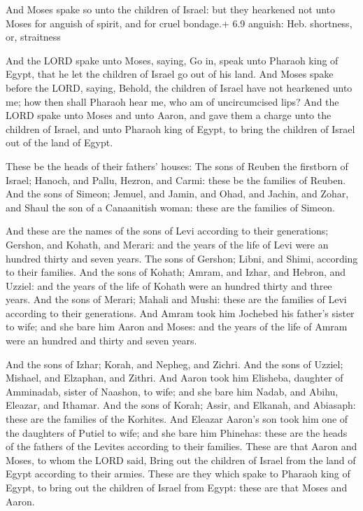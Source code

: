  And Moses spake so unto the children of Israel: but they
hearkened not unto Moses for anguish of spirit, and for cruel bondage.+
6.9 anguish: Heb. shortness, or, straitness

 And the LORD spake unto Moses, saying,  Go
in, speak unto Pharaoh king of Egypt, that he let the children of Israel
go out of his land.  And Moses spake before the LORD,
saying, Behold, the children of Israel have not hearkened unto me; how
then shall Pharaoh hear me, who am of uncircumcised lips? 
And the LORD spake unto Moses and unto Aaron, and gave them a charge
unto the children of Israel, and unto Pharaoh king of Egypt, to bring
the children of Israel out of the land of Egypt.

 These be the heads of their fathers' houses: The sons of
Reuben the firstborn of Israel; Hanoch, and Pallu, Hezron, and Carmi:
these be the families of Reuben.  And the sons of Simeon;
Jemuel, and Jamin, and Ohad, and Jachin, and Zohar, and Shaul the son of
a Canaanitish woman: these are the families of Simeon.

 And these are the names of the sons of Levi according to
their generations; Gershon, and Kohath, and Merari: and the years of the
life of Levi were an hundred thirty and seven years.  The
sons of Gershon; Libni, and Shimi, according to their families.
 And the sons of Kohath; Amram, and Izhar, and Hebron, and
Uzziel: and the years of the life of Kohath were an hundred thirty and
three years.  And the sons of Merari; Mahali and Mushi:
these are the families of Levi according to their generations.
 And Amram took him Jochebed his father's sister to wife;
and she bare him Aaron and Moses: and the years of the life of Amram
were an hundred and thirty and seven years.

 And the sons of Izhar; Korah, and Nepheg, and Zichri.
 And the sons of Uzziel; Mishael, and Elzaphan, and Zithri.
 And Aaron took him Elisheba, daughter of Amminadab, sister
of Naashon, to wife; and she bare him Nadab, and Abihu, Eleazar, and
Ithamar.  And the sons of Korah; Assir, and Elkanah, and
Abiasaph: these are the families of the Korhites.  And
Eleazar Aaron's son took him one of the daughters of Putiel to wife; and
she bare him Phinehas: these are the heads of the fathers of the Levites
according to their families.  These are that Aaron and
Moses, to whom the LORD said, Bring out the children of Israel from the
land of Egypt according to their armies.  These are they
which spake to Pharaoh king of Egypt, to bring out the children of
Israel from Egypt: these are that Moses and Aaron.

